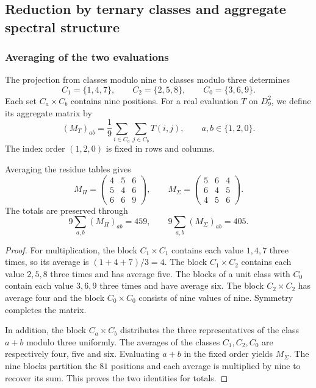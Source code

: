 \subsection{Reduction by ternary classes and aggregate spectral structure}
\label{geo:agregacion}

\subsubsection{Averaging of the two evaluations}

The projection from classes modulo nine to classes modulo three determines
\[
 C_1=\{1,4,7\},\qquad
 C_2=\{2,5,8\},\qquad
 C_0=\{3,6,9\}.
\]
Each set $C_a\times C_b$ contains nine positions. For a real evaluation $T$ on $D_9^2$, we define its aggregate matrix by
\[
 (M_T)_{ab}=\frac19\sum_{i\in C_a}\sum_{j\in C_b}T(i,j),
 \qquad a,b\in\{1,2,0\}.
\]
The index order $(1,2,0)$ is fixed in rows and columns.

\begin{proposicion}
\label{geo:prop-agregadas}
Averaging the residue tables gives
\[
 M_\Pi=\begin{pmatrix}4&5&6\\5&4&6\\6&6&9\end{pmatrix},
 \qquad
 M_\Sigma=\begin{pmatrix}5&6&4\\6&4&5\\4&5&6\end{pmatrix}.
\]
The totals are preserved through
\[
 9\sum_{a,b}(M_\Pi)_{ab}=459,
 \qquad9\sum_{a,b}(M_\Sigma)_{ab}=405.
\]
\end{proposicion}

\begin{proof}
For multiplication, the block $C_1\times C_1$ contains each value $1,4,7$ three times, so its average is $(1+4+7)/3=4$. The block $C_1\times C_2$ contains each value $2,5,8$ three times and has average five. The blocks of a unit class with $C_0$ contain each value $3,6,9$ three times and have average six. The block $C_2\times C_2$ has average four and the block $C_0\times C_0$ consists of nine values of nine. Symmetry completes the matrix.

In addition, the block $C_a\times C_b$ distributes the three representatives of the class $a+b$ modulo three uniformly. The averages of the classes $C_1,C_2,C_0$ are respectively four, five and six. Evaluating $a+b$ in the fixed order yields $M_\Sigma$. The nine blocks partition the $81$ positions and each average is multiplied by nine to recover its sum. This proves the two identities for totals.
\end{proof}

